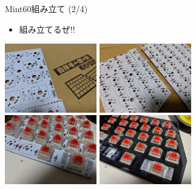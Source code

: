 \documentclass[cjk,dvipdfmx,10pt,compress,fragile%
hyperref={bookmarks=true,bookmarksnumbered=true,bookmarksopen=false,%
colorlinks=false,%
pdftitle={第 134 回 関西 Debian 勉強会},%
pdfauthor={小林},%
pdfsubject={資料},%
}]{beamer}
\begin{document}
\begin{frame}[fragile,t]{Mint60組み立て (2/4)}
 \begin{itemize}
  \item 組み立てるぜ!!
 \end{itemize}
 \begin{center}
  \includegraphics[keepaspectratio,height=3cm]{./img/mint60-build-01.jpg} \hspace*{1zw}
  \includegraphics[keepaspectratio,height=3cm]{./img/mint60-build-02.jpg} \\
  \includegraphics[keepaspectratio,height=3cm]{./img/mint60-build-03.jpg} \hspace*{1zw}
  \includegraphics[keepaspectratio,height=3cm]{./img/mint60-build-04.jpg}
 \end{center}
\end{frame}
\end{document}
